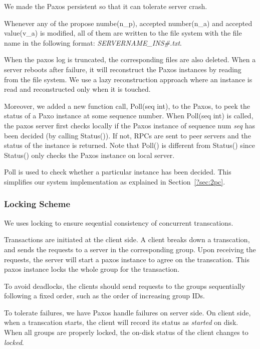 \documentclass{vldb}
\begin{document}
We made the Paxos persistent so that it can tolerate server crash.

Whenever any of the propose numbe(n\_p), accepted number(n\_a) and accepted value(v\_a)
is modified, all of them are written to the file system with the file name in the
following format: \textit{SERVERNAME\_INS\#.txt}.

When the paxos log is truncated, the corresponding files are also deleted. When a
server reboots after failure, it will reconstruct the Paxos instances by reading from
the file system. We use a lazy reconstruction approach where an instance is read and
reconstructed only when it is touched.

Moreover, we added a new function call, Poll(seq int), to the Paxos, to peek the
status of a Paxo instance at some sequence number. When Poll(seq int) is called, the
paxos server first checks locally if the Paxos instance of sequence num \textit{seq}
has been decided (by calling Status()). If not, RPCs are sent to peer servers and the
status of the instance is returned. Note that Poll() is different from Status() since
Status() only checks the Paxos instance on local server.

Poll is used to check whether a particular instance has been decided. This simplifies
our system implementation as explained in Section~\ref{?sec:2pc}.


\subsubsection{Locking Scheme}
\label{sec:lock}

We uses locking to ensure seqential consistency of concurrent transcations.

Transactions are initiated at the client side. A client breaks down a transcation,
and sends the requests to a server in the corresponding group. Upon receiving the
requests, the server will start a paxos instance to agree on the transcation. This
paxos instance locks the whole group for the transaction.

To avoid deadlocks, the clients should send requests to the groups sequentially
following a fixed order, such as the order of increasing group IDs.

To tolerate failures, we have Paxos handle failures on server side. On client side,
when a transcation starts, the client will record its status as \textit{started} on
disk. When all groups are properly locked, the on-disk status of the client changes
to \textit{locked}.
\end{document}
